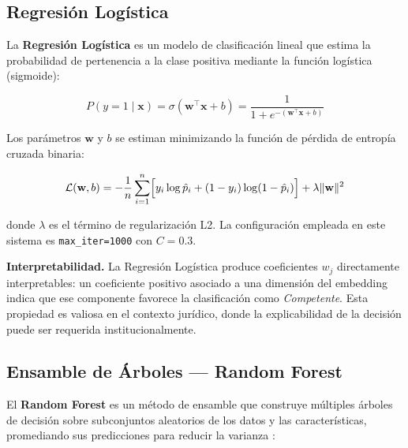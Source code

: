 \subsection{Regresión Logística}

La \textbf{Regresión Logística} es un modelo de clasificación lineal que estima
la probabilidad de pertenencia a la clase positiva mediante la función
logística (sigmoide):

\begin{equation}
  P(y = 1 \mid \mathbf{x})
  = \sigma(\mathbf{w}^\top \mathbf{x} + b)
  = \frac{1}{1 + e^{-(\mathbf{w}^\top \mathbf{x} + b)}}
  \label{eq:logistica}
\end{equation}

Los parámetros $\mathbf{w}$ y $b$ se estiman minimizando la función de pérdida
de entropía cruzada binaria:

\begin{equation}
  \mathcal{L}(\mathbf{w}, b)
  = -\frac{1}{n} \sum_{i=1}^n
    \Bigl[y_i \log \hat{p}_i + (1 - y_i) \log(1 - \hat{p}_i)\Bigr]
  + \lambda \|\mathbf{w}\|^2
  \label{eq:cross-entropy}
\end{equation}

donde $\lambda$ es el término de regularización L2. La configuración empleada
en este sistema es \texttt{max\_iter=1000} con $C = 0.3$.

\noindent\textbf{Interpretabilidad.} La Regresión Logística produce coeficientes
$w_j$ directamente interpretables: un coeficiente positivo asociado a una
dimensión del embedding indica que ese componente favorece la clasificación como
\textit{Competente}. Esta propiedad es valiosa en el contexto jurídico, donde
la explicabilidad de la decisión puede ser requerida institucionalmente.

\subsection{Ensamble de Árboles — Random Forest}

El \textbf{Random Forest} es un método de ensamble que construye múltiples
árboles de decisión sobre subconjuntos aleatorios de los datos y las
características, promediando sus predicciones para reducir la varianza
\cite{breiman2001}:

